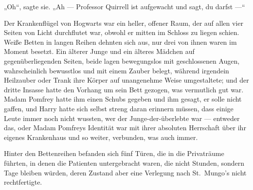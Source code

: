„Oh“, sagte sie.
„Ah — Professor Quirrell ist aufgewacht und sagt, du darfst —“

\later

Der Krankenflügel von Hogwarts war ein heller, offener Raum, der auf allen vier Seiten von Licht durchflutet war, obwohl er mitten im Schloss zu liegen schien. Weiße Betten in langen Reihen dehnten sich aus, nur drei von ihnen waren im Moment besetzt. Ein älterer Junge und ein älteres Mädchen auf gegenüberliegenden Seiten, beide lagen bewegungslos mit geschlossenen Augen, wahrscheinlich bewusstlos und mit einem Zauber belegt, während irgendein Heilzauber oder Trank ihre Körper auf unangenehme Weise umgestaltete; und der dritte Insasse hatte den Vorhang um sein Bett gezogen, was vermutlich gut war. Madam Pomfrey hatte ihm einen Schubs gegeben und ihm gesagt, er solle nicht gaffen, und Harry hatte sich selbst streng daran erinnern müssen, dass einige Leute immer noch nicht wussten, wer der Junge-der-überlebte war — entweder das, oder Madam Pomfreys Identität war mit ihrer absoluten Herrschaft über ihr eigenes Krankenhaus und so weiter, verbunden, was auch immer.

Hinter den Bettenreihen befanden sich fünf Türen, die in die Privaträume führten, in denen die Patienten untergebracht waren, die nicht Stunden, sondern Tage bleiben würden, deren Zustand aber eine Verlegung nach St.~Mungo’s nicht rechtfertigte.


